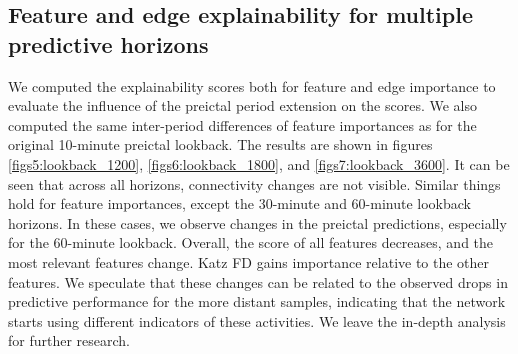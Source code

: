 \documentclass[a4paper,fleqn]{cas-sc}
\begin{document}
\subsection{Feature and edge explainability for multiple predictive horizons}

We computed the explainability scores both for feature and edge importance to evaluate the influence of the preictal period extension on the scores. We also computed the same inter-period differences of feature importances as for the original 10-minute preictal lookback. The results are shown in figures \ref{figs5:lookback_1200}, \ref{figs6:lookback_1800}, and \ref{figs7:lookback_3600}. It can be seen that across all horizons, connectivity changes are not visible. Similar things hold for feature importances, except the 30-minute and 60-minute lookback horizons. In these cases, we observe changes in the preictal predictions, especially for the 60-minute lookback. Overall, the score of all features decreases, and the most relevant features change. Katz FD gains importance relative to the other features. We speculate that these changes can be related to the observed drops in predictive performance for the more distant samples, indicating that the network starts using different indicators of these activities. We leave the in-depth analysis for further research.
\end{document}
